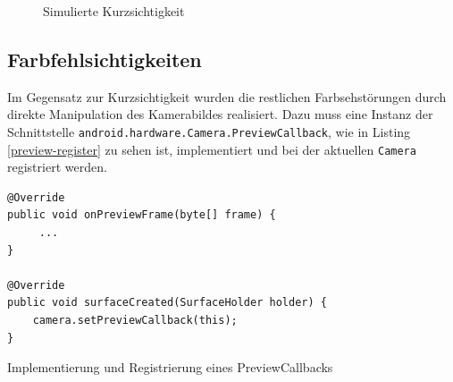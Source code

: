 \documentclass[a4paper]{article}
\begin{document}
\begin{figure}[H]
\centering
{}
\caption{Simulierte Kurzsichtigkeit}
\label{simulated-myopia}
\end{figure}

\newpage

\subsection*{Farbfehlsichtigkeiten}
Im Gegensatz zur Kurzsichtigkeit wurden die restlichen Farbsehstörungen durch direkte Manipulation des Kamerabildes realisiert. Dazu muss eine Instanz der Schnittstelle \texttt{android.hardware.Camera.PreviewCallback}, wie in Listing \ref{preview-register} zu sehen ist, implementiert und bei der aktuellen \texttt{Camera} registriert werden.

\begin{listing}[H]
\begin{verbatim}
@Override
public void onPreviewFrame(byte[] frame) {
     ...
}

@Override
public void surfaceCreated(SurfaceHolder holder) {
    camera.setPreviewCallback(this);
}
\end{verbatim}
\caption{Implementierung und Registrierung eines PreviewCallbacks}
\label{preview-register}
\end{listing}
\end{document}
